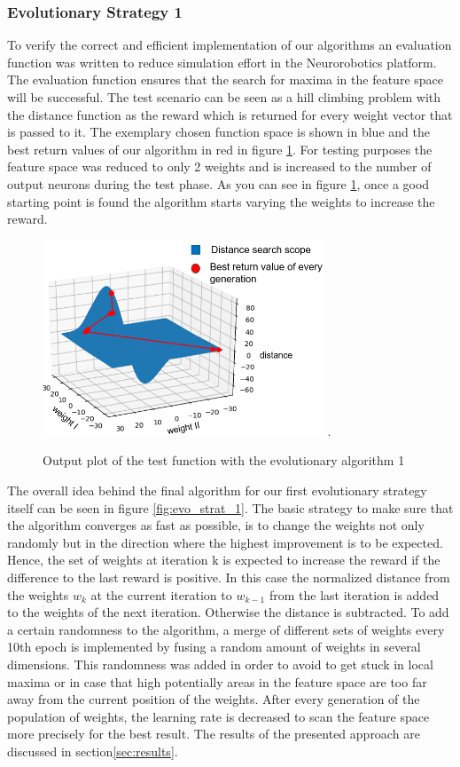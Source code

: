 \subsubsection{Evolutionary Strategy 1}
To verify the correct and efficient implementation of our algorithms an evaluation function was written to reduce simulation effort in the Neurorobotics platform. The evaluation function ensures that the search for maxima in the feature space will be successful. The test scenario can be seen as a hill climbing problem with the distance function as the reward which is returned for every weight vector that is passed to it. The exemplary chosen function space is shown in blue and the best return values of our algorithm in red in figure \ref{fig:test_function}. For testing purposes the feature space was reduced to only 2 weights and is increased to the number of output neurons during the test phase.
As you can see in figure \ref{fig:test_function}, once a good starting point is found the algorithm starts varying the weights to increase the reward. 


\begin{figure}[H]
	\centering
	\includegraphics[width=3.3in]{img/test_function.png}
	\DeclareGraphicsExtensions.
	\caption{Output plot of the test function with the evolutionary algorithm 1}
	\label{fig:test_function}
\end{figure}

The overall idea behind the final algorithm for our first evolutionary strategy itself can be seen in figure \ref{fig:evo_strat_1}. The basic strategy to make sure that the algorithm converges as fast as possible, is to change the weights not only randomly but in the direction where the highest improvement is to be expected. Hence, the set of weights at iteration k is expected to increase the reward if the difference to the last reward is positive. In this case the normalized distance from the weights $w_k$  at the current iteration to $w_{k-1}$ from the last iteration is added to the weights of the next iteration. Otherwise the distance is subtracted. To add a certain randomness to the algorithm, a merge of different sets of weights every 10th epoch is implemented by fusing a random amount of weights in several dimensions. This randomness was added in order to avoid to get stuck in local maxima or in case that high potentially areas in the feature space are too far away from the current position of the weights. After every generation of the population of weights, the learning rate is decreased to scan the feature space more precisely for the best result. 
The results of the presented approach are discussed in section\ref{sec:results}.


